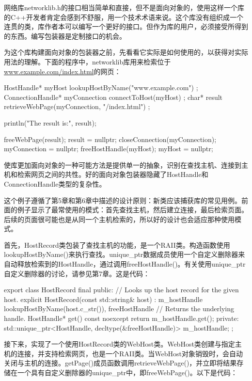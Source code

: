 网络库networklib.h的接口相当简单和直接，但不是面向对象的，使用这样一个库的C++开发者肯定会感到不舒服，用一个技术术语来说。这个库没有组织成一个连贯的类，库作者本可以编写一个更好的接口。但作为库的用户，必须接受所得到的东西。编写包装器是定制接口的机会。

为这个库构建面向对象的包装器之前，先看看它实际是如何使用的，以获得对实际用法的理解。下面的程序中，networklib库用来检索位于\url{www.example.com/index.html}的网页：

\begin{cpp}
HostHandle* myHost { lookupHostByName("www.example.com") };
ConnectionHandle* myConnection { connectToHost(myHost) };
char* result { retrieveWebPage(myConnection, "/index.html") };

println("The result is:\n{}", result);

freeWebPage(result); result = nullptr;
closeConnection(myConnection); myConnection = nullptr;
freeHostHandle(myHost); myHost = nullptr;
\end{cpp}

使库更加面向对象的一种可能方法是提供单一的抽象，识别在查找主机、连接到主机和检索网页之间的共性。好的面向对象包装器隐藏了HostHandle和ConnectionHandle类型的复杂性。

这个例子遵循了第5章和第6章中描述的设计原则：新类应该捕获库的常见用例。前面的例子显示了最常使用的模式：首先查找主机，然后建立连接，最后检索页面。后续的页面很可能也是从同一个主机检索的，所以好的设计也会适应那种使用模式。

首先，HostRecord类包装了查找主机的功能，是一个RAII类。构造函数使用lookupHostByName()来执行查找。unique\_ptr数据成员使用一个自定义删除器来自动释放检索到的HostHandle，通过调用freeHostHandle()。有关使用unique\_ptr自定义删除器的讨论，请参见第7章。这是代码：

\begin{cpp}
export class HostRecord final
{
    public:
        // Looks up the host record for the given host.
        explicit HostRecord(const std::string& host)
            : m_hostHandle { lookupHostByName(host.c_str()), freeHostHandle }
        { }
        // Returns the underlying handle.
        HostHandle* get() const noexcept { return m_hostHandle.get(); }
    private:
        std::unique_ptr<HostHandle, decltype(&freeHostHandle)> m_hostHandle;
};
\end{cpp}

接下来，实现了一个使用HostRecord类的WebHost类。WebHost类创建与指定主机的连接，并支持检索网页，也是一个RAII类。当WebHost对象销毁时，会自动关闭与主机的连接。getPage()成员函数调用retrieveWebPage()，并立即将结果存储在一个具有自定义删除器的unique\_ptr中，即freeWebPage()。以下是代码：


